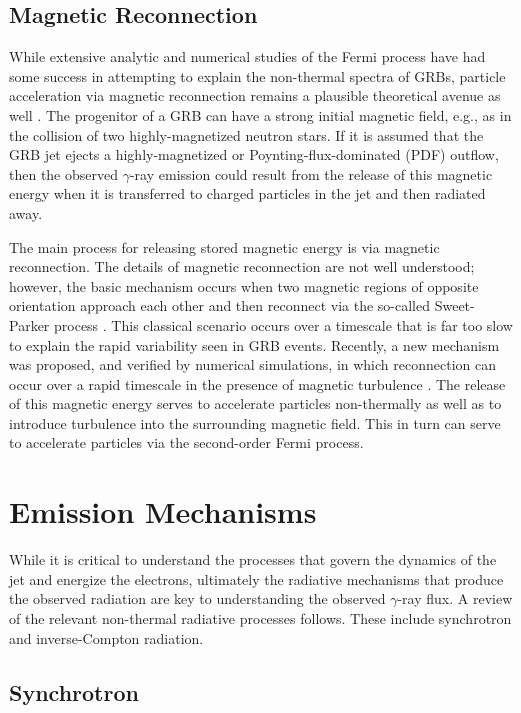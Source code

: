\subsection{Magnetic Reconnection}
\label{sec:MR}
While extensive analytic and numerical studies of the Fermi process
have had some success in attempting to explain the non-thermal spectra
of GRBs, particle acceleration via magnetic reconnection remains a
plausible theoretical avenue as well
\cite{zhang:2011,Meszaros:1997b,Meszaros:1994,Thompson:1994,Usov:1994}.
The progenitor of a GRB can have a strong initial magnetic field,
e.g., as in the collision of two highly-magnetized neutron stars. If
it is assumed that the GRB jet ejects a highly-magnetized or
Poynting-flux-dominated (PDF) outflow, then the observed $\gamma$-ray
emission could result from the release of this magnetic energy when it
is transferred to charged particles in the jet and then radiated away.

The main process for releasing stored magnetic energy is via magnetic
reconnection. The details of magnetic reconnection are not well
understood; however, the basic mechanism occurs when two magnetic
regions of opposite orientation approach each other and then reconnect
via the so-called Sweet-Parker process
\cite{Parker:1957,Sweet:1958}. This classical scenario occurs over a
timescale that is far too slow to explain the rapid variability seen
in GRB events. Recently, a new mechanism was proposed, and verified by
numerical simulations, in which reconnection can occur over a rapid
timescale in the presence of magnetic turbulence
\cite{Kowal:2009,Lazarian:1999}. The release of this magnetic energy
serves to accelerate particles non-thermally as well as to
introduce turbulence into the surrounding magnetic field.  This in
turn can serve to accelerate particles via the second-order Fermi
process.


\section{Emission Mechanisms}
\label{sec:emissionMech}
While it is critical to understand the processes that govern the
dynamics of the jet and energize the electrons, ultimately the
radiative mechanisms that produce the observed radiation are key to
understanding the observed $\gamma$-ray flux. A review of the relevant
non-thermal radiative processes follows. These include synchrotron and
inverse-Compton radiation.

\subsection{Synchrotron}
\label{sec:synctheory}

